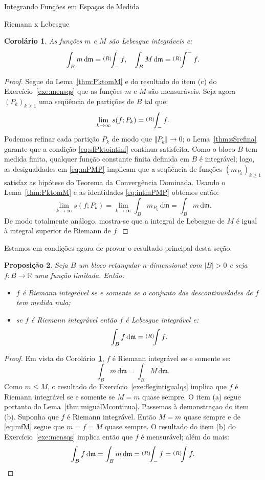 \documentclass[oneside,final,11pt]{amsbook}
\newcommand{\R}{\mathds R}
\newcommand{\leb}{\mathfrak m}
\newcommand{\dd}{\mathrm d}
\newcommand{\intinfd}{\raise2pt\hbox{$\scriptstyle(R)$}\!\!\int_-}
\newcommand{\intsupd}{\raise2pt\hbox{$\scriptstyle(R)$}\!\!\int^-}
\newcommand{\intRd}{\raise2pt\hbox{$\scriptstyle(R)$}\!\!\int}
\theoremstyle{remark}\newtheorem{exercise}{Exercício}[chapter]
\theoremstyle{remark}\newtheorem{*exercise}[exercise]{\hbox to 0pt{\hskip 0pt minus 1fil*}Exercício}
\theoremstyle{definition}\newtheorem{exdefin}{Definição}[chapter]
\theoremstyle{plain}\newtheorem{teo}{Teorema}[section]
\theoremstyle{plain}\newtheorem{lem}[teo]{Lema}
\theoremstyle{plain}\newtheorem{prop}[teo]{Proposição}
\theoremstyle{plain}\newtheorem{cor}[teo]{Corolário}
\theoremstyle{definition}\newtheorem{defin}[teo]{Definição}
\theoremstyle{remark}\newtheorem{rem}[teo]{Observação}
\theoremstyle{definition}\newtheorem{notation}[teo]{Notação}
\theoremstyle{definition}\newtheorem{convention}[teo]{Convenção}
\theoremstyle{definition}\newtheorem{example}[teo]{Exemplo}
\numberwithin{section}{chapter}
\numberwithin{equation}{section}
\begin{document}
\begin{chapter}{Integrando Funções em Espaços de Medida}
\begin{section}{Riemann x Lebesgue}
\begin{cor}\label{thm:corintmM}
As funções $m$ e $M$ são Lebesgue integráveis e:
\[\int_Bm\,\dd\leb=\intinfd f,\quad\int_BM\,\dd\leb=\intsupd f.\]
\end{cor}
\begin{proof}
Segue do Lema~\ref{thm:PktomM} e do resultado do item (c) do Exercício~\ref{exe:mensqs}
que as funções $m$ e $M$ são mensuráveis. Seja agora $(P_k)_{k\ge1}$ uma seqüência de partições
de $B$ tal que:
\begin{equation}\label{eq:sfPktointinf}
\lim_{k\to\infty}s(f;P_k)=\intinfd f.
\end{equation}
Podemos refinar cada partição $P_k$ de modo que $\Vert P_k\Vert\to0$; o Lema~\ref{thm:sSrefina}
garante que a condição \eqref{eq:sfPktointinf} continua satisfeita. Como o bloco $B$
tem medida finita, qualquer função constante finita definida em $B$ é integrável; logo,
as desigualdades em \eqref{eq:mPMP} implicam que a seqüência de funções $(m_{P_k})_{k\ge1}$
satisfaz as hipótese do Teorema da Convergência Dominada. Usando o Lema~\ref{thm:PktomM}
e as identidades \eqref{eq:intmPMP} obtemos então:
\[\lim_{k\to\infty}s(f;P_k)=\lim_{k\to\infty}\int_Bm_{P_k}\,\dd\leb=\int_Bm\,\dd\leb.\]
De modo totalmente análogo, mostra-se que a integral de Lebesgue de $M$ é igual à integral superior
de Riemann de $f$.
\end{proof}

Estamos em condições agora de provar o resultado principal desta seção.
\begin{prop}\label{thm:propRiemannLebesgue}
Seja $B$ um bloco retangular $n$-dimensional com $\vert B\vert>0$ e seja $f:B\to\R$ uma função
limitada. Então:
\begin{itemize}
\item[(a)] $f$ é Riemann integrável se e somente se o conjunto das descontinuidades de $f$
tem medida nula;
\item[(b)] se $f$ é Riemann integrável então $f$ é Lebesgue integrável e:
\[\int_Bf\,\dd\leb=\intRd f.\]
\end{itemize}
\end{prop}
\begin{proof}
Em vista do Corolário~\ref{thm:corintmM}, $f$ é Riemann integrável se e somente se:
\[\int_Bm\,\dd\leb=\int_BM\,\dd\leb.\]
Como $m\le M$, o resultado do Exercício~\ref{exe:flegintigualqs} implica que
$f$ é Riemann integrável se e somente se $M=m$ quase sempre. O item (a) segue portanto
do Lema~\ref{thm:migualMcontinua}. Passemos à demonstraçao do item (b). Suponha que $f$
é Riemann integrável. Então $M=m$ quase sempre e de \eqref{eq:mfM} segue que
$m=f=M$ quase sempre. O resultado do item (b) do Exercício~\ref{exe:mensqs} implica
então que $f$ é mensurável; além do mais:
\[\int_B f\,\dd\leb=\int_B m\,\dd\leb=\intinfd f=\intRd f.\qedhere\]
\end{proof}


\end{section}
\end{chapter}
\end{document}
